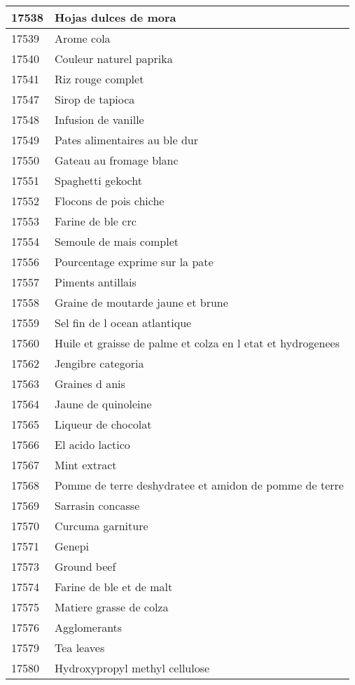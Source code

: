\begin{longtable}{|l|l|}
17538 & Hojas dulces de mora \\ \hline 
17539 & Arome cola \\ \hline 
17540 & Couleur naturel paprika \\ \hline 
17541 & Riz rouge complet \\ \hline 
17547 & Sirop de tapioca \\ \hline 
17548 & Infusion de vanille \\ \hline 
17549 & Pates alimentaires au ble dur \\ \hline 
17550 & Gateau au fromage blanc \\ \hline 
17551 & Spaghetti gekocht \\ \hline 
17552 & Flocons de pois chiche \\ \hline 
17553 & Farine de ble crc \\ \hline 
17554 & Semoule de mais complet \\ \hline 
17556 & Pourcentage exprime sur la pate \\ \hline 
17557 & Piments antillais \\ \hline 
17558 & Graine de moutarde jaune et brune \\ \hline 
17559 & Sel fin de l ocean atlantique \\ \hline 
17560 & Huile et graisse de palme et colza en l etat et hydrogenees \\ \hline 
17562 & Jengibre categoria \\ \hline 
17563 & Graines d anis \\ \hline 
17564 & Jaune de quinoleine \\ \hline 
17565 & Liqueur de chocolat \\ \hline 
17566 & El acido lactico \\ \hline 
17567 & Mint extract \\ \hline 
17568 & Pomme de terre deshydratee et amidon de pomme de terre \\ \hline 
17569 & Sarrasin concasse \\ \hline 
17570 & Curcuma garniture \\ \hline 
17571 & Genepi \\ \hline 
17573 & Ground beef \\ \hline 
17574 & Farine de ble et de malt \\ \hline 
17575 & Matiere grasse de colza \\ \hline 
17576 & Agglomerants \\ \hline 
17579 & Tea leaves \\ \hline 
17580 & Hydroxypropyl methyl cellulose \\ \hline 

\end{longtable}
